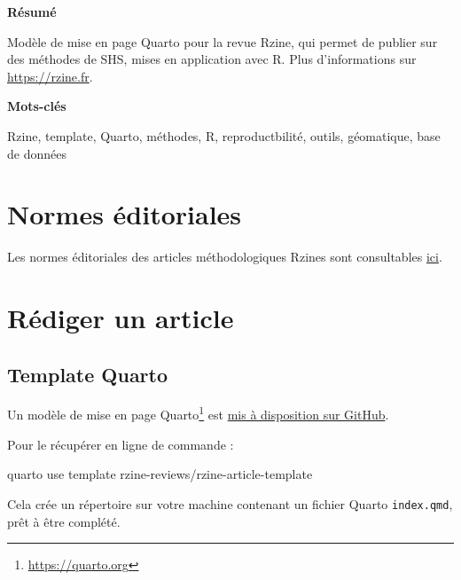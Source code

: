 \documentclass[
  french,
  11pt,
  a4paper,
]{article}
\newenvironment{Shaded}{\begin{snugshade}}{\end{snugshade}}
\newcommand{\ExtensionTok}[1]{\textcolor[rgb]{0.00,0.23,0.31}{#1}}
\newcommand{\NormalTok}[1]{\textcolor[rgb]{0.00,0.23,0.31}{#1}}
\renewcommand*\contentsname{Table des matières}
\newcommand\contentsname{Table des matières}
\begin{document}
\noindent\textbf{Résumé}\par
Modèle de mise en page Quarto pour la revue Rzine, qui permet de publier
sur des méthodes de SHS, mises en application avec R. Plus
d'informations sur \url{https://rzine.fr}.


\noindent\textbf{Mots-clés}\par
Rzine, template, Quarto, méthodes, R, reproductbilité, outils, géomatique, base
de données %
\vfill


{}

\renewcommand*\contentsname{Sommaire}
{
\hypersetup{linkcolor=MidnightBlue}
\setcounter{tocdepth}{3}
\tableofcontents
}
\listoffigures
\listoftables

\newpage

\section{Normes éditoriales}\label{normes-uxe9ditoriales}

Les normes éditoriales des articles méthodologiques Rzines sont
consultables \href{https://rzine.fr/documentation/normes/}{ici}.

\section{Rédiger un article}\label{ruxe9diger-un-article}

\subsection{Template Quarto}\label{template-quarto}

Un modèle de mise en page Quarto\footnote{\url{https://quarto.org}} est
\href{https://github.com/rzine-reviews/rzine-article-template}{mis à
disposition sur GitHub}.

Pour le récupérer en ligne de commande :

\begin{Shaded}
\begin{Highlighting}[]
\ExtensionTok{quarto}\NormalTok{ use template rzine{-}reviews/rzine{-}article{-}template}
\end{Highlighting}
\end{Shaded}

Cela crée un répertoire sur votre machine contenant un fichier Quarto
\texttt{index.qmd}, prêt à être complété.
\end{document}
